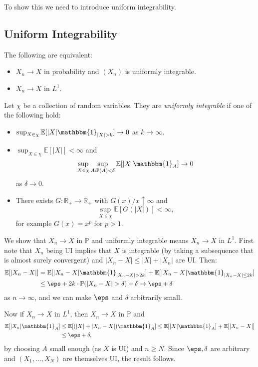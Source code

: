 \documentclass[12pt]{article}
\begin{document}

To show this we need to introduce uniform integrability.

\subsection{Uniform Integrability}%
\label{sub:ui}

\begin{theorem}[Vitali]
	The following are equivalent:
	\begin{itemize}
		\item $X_n \to X$ in probability and $(X_n)$ is uniformly integrable.
		\item $X_n \to X$ in $L^1$.
	\end{itemize}
\end{theorem}

\begin{definition}
	Let $\chi$ be a collection of random variables. They are \emph{uniformly integrable} if one of the following hold:
	\begin{itemize}
		\item $\sup_{X \in \chi} \mathbb{E}[|X| \mathbbm{1}_{|X| > k}] \to 0$ as $k \to \infty$.
		\item $\sup_{X \in \chi} \mathbb{E}[|X|] < \infty$ and
			\[
			\sup_{X \in \chi} \sup_{A : \mathbb{P}(A) < \delta} \mathbb{E}[|X| \mathbbm{1}_{A}] \to 0
			\]
			as $\delta \to 0$.
		\item There exists $G : \mathbb{R}_+ \to \mathbb{R}_+$ with $G(x)/ x \uparrow \infty$ and
			\[
			\sup_{X \in \chi} \mathbb{E}[G(|X|)] < \infty,
			\]
			for example $G(x) = x^{p}$ for $p > 1$.
	\end{itemize}
\end{definition}

\begin{proofbox}
	We show that $X_n \to X$ in $\mathbb{P}$ and uniformly integrable means $X_n \to X$ in $L^1$. First note that $X_n$ being UI implies that $X$ is integrable (by taking a subsequence that is almost surely convergent) and $|X_n - X| \leq |X| + |X_n|$ are UI. Then:
	\begin{align*}
		\mathbb{E}[|X_n - X|] &= \mathbb{E}[|X_n - X| \mathbbm{1}_{|X_n - X| > 2k}] + \mathbb{E}[|X_n - X| \mathbbm{1}_{|X_n - X| \leq 2k}] \\
				      &\leq \eps + 2k \cdot \mathbb{P}(|X_n - X| > \delta) + \delta \to \eps + \delta
	\end{align*}
	as $n \to \infty$, and we can make $\eps$ and $\delta$ arbitrarily small.

	Now if $X_n \to X$ in $L^1$, then $X_n \to X$ in $\mathbb{P}$ and
	\begin{align*}
		\mathbb{E}[|X_n| \mathbbm{1}_{A}] &\leq \mathbb{E}[(|X| + |X_n - X|) \mathbbm{1}_{A}] \leq \mathbb{E}[|X| \mathbbm{1}_{A}] + \mathbb{E}[|X_n - X|] \\
						  &\leq \eps + \delta,
	\end{align*}
	by choosing $A$ small enough (as $X$ is UI) and $n \geq N$. Since $\eps, \delta$ are arbitrary and $(X_1, \ldots, X_N)$ are themselves UI, the result follows.
\end{proofbox}
\end{document}
